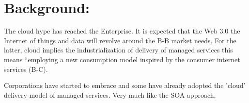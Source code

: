 
\ifpdf
    \graphicspath{{1_introduction/figures/PNG/}{1_introduction/figures/PDF/}{1_introduction/figures/}}
\else
    \graphicspath{{1_introduction/figures/EPS/}{1_introduction/figures/}}
\fi






\section{Background:} %
 The cloud hype has reached the Enterprise. It is expected that the Web 3.0 the Internet of things and data will revolve around the B-B market needs. For the latter, cloud implies the industrialization of delivery of managed services this means “employing a new consumption model inspired by the consumer internet services (B-C). 

Corporations have started to embrace and some have already adopted the 'cloud' delivery model of managed services. Very much like the SOA approach, 

